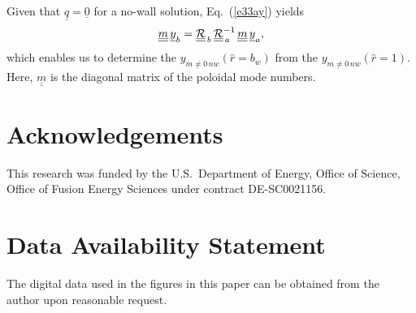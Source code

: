 \documentclass[12pt,prb,aps]{revtex4-1}
\begin{document}
 Given that $\underline{q}=\underline{0}$ for a no-wall solution, Eq.~(\ref{e33ay}) yields  
 \begin{equation}
\underline{\underline{m}}\, \underline{y}_b = \underline{\underline{\cal R}}_{\,b}\,\underline{\underline{\cal R}}_{\,a}^{-1}\,\underline{\underline{m}}\,\underline{y}_a,
\end{equation}
which enables us to determine the $y_{m\neq 0\,nw}(\hat{r}=b_w)$ from the $y_{m\neq 0\,nw}(\hat{r}=1)$. Here, $\underline{\underline{m}}$ is the diagonal matrix of the poloidal
mode numbers. 

\section*{Acknowledgements}
This research was funded by the  U.S.\ Department of Energy, Office of Science, Office of Fusion Energy Sciences under contract DE-SC0021156.

\section*{Data Availability Statement}
The digital data used in the figures in this paper can be obtained from the author upon reasonable request. 
\end{document}
